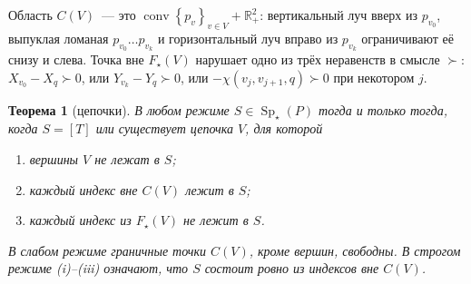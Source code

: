 \documentclass[a4paper,11pt]{article}
\theoremstyle{plain}
\newtheorem{theorem}{Теорема}[section]
\theoremstyle{definition}
\theoremstyle{remark}
\newcommand{\R}{\mathbb{R}}
\newcommand{\set}[1]{\left\{ #1 \right\}}
\newcommand{\Rp}[1][2]{\R^{#1}_{+}}
\DeclareMathOperator{\conv}{conv}
\DeclareMathOperator{\Sp}{Sp}
\newcommand{\Spm}{\Sp_\star}
\newcommand{\gs}{\mathrel{\succ}}
\begin{document}
Область $C(V)$~--- это $\conv\set{p_v}_{v\in V}+\Rp$: вертикальный луч вверх из $p_{v_0}$, выпуклая ломаная $p_{v_0}\dots p_{v_k}$ и горизонтальный луч вправо из $p_{v_k}$ ограничивают её снизу и слева. Точка вне $F_\star(V)$ нарушает одно из трёх неравенств в смысле $\gs$: $X_{v_0}-X_q\gs0$, или $Y_{v_k}-Y_q\gs0$, или $-\chi(v_j,v_{j+1},q)\gs0$ при некотором $j$.

\begin{theorem}[цепочки]\label{thm:chain}
    В любом режиме $S\in\Spm(P)$ тогда и только тогда, когда $S=[T]$ или существует цепочка $V$, для которой
    \begin{enumerate}[label=(\roman*)]
        \item вершины $V$ не лежат в $S$;
        \item каждый индекс вне $C(V)$ лежит в $S$;
        \item каждый индекс из $F_\star(V)$ не лежит в $S$.
    \end{enumerate}
    В слабом режиме граничные точки $C(V)$, кроме вершин, свободны. В строгом режиме (i)--(iii) означают, что $S$ состоит ровно из индексов вне $C(V)$.
\end{theorem}
\end{document}
